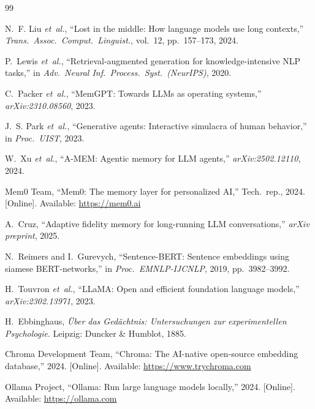 \documentclass[conference]{IEEEtran}
\begin{document}
\begin{thebibliography}{99}

N.~F. Liu \emph{et~al.}, ``Lost in the middle: How language models use long contexts,'' \emph{Trans.\ Assoc.\ Comput.\ Linguist.}, vol.~12, pp.~157--173, 2024.

P.~Lewis \emph{et~al.}, ``Retrieval-augmented generation for knowledge-intensive NLP tasks,'' in \emph{Adv.\ Neural Inf.\ Process.\ Syst.\ (NeurIPS)}, 2020.

C.~Packer \emph{et~al.}, ``MemGPT: Towards LLMs as operating systems,'' \emph{arXiv:2310.08560}, 2023.

J.~S. Park \emph{et~al.}, ``Generative agents: Interactive simulacra of human behavior,'' in \emph{Proc.\ UIST}, 2023.

W.~Xu \emph{et~al.}, ``A-MEM: Agentic memory for LLM agents,'' \emph{arXiv:2502.12110}, 2024.

Mem0 Team, ``Mem0: The memory layer for personalized AI,'' Tech.\ rep., 2024. [Online]. Available: \url{https://mem0.ai}

A.~Cruz, ``Adaptive fidelity memory for long-running LLM conversations,'' \emph{arXiv preprint}, 2025.

N.~Reimers and I.~Gurevych, ``Sentence-BERT: Sentence embeddings using siamese BERT-networks,'' in \emph{Proc.\ EMNLP-IJCNLP}, 2019, pp.~3982--3992.

H.~Touvron \emph{et~al.}, ``LLaMA: Open and efficient foundation language models,'' \emph{arXiv:2302.13971}, 2023.

H.~Ebbinghaus, \emph{\"Uber das Ged\"achtnis: Untersuchungen zur experimentellen Psychologie}. Leipzig: Duncker \& Humblot, 1885.

Chroma Development Team, ``Chroma: The AI-native open-source embedding database,'' 2024. [Online]. Available: \url{https://www.trychroma.com}

Ollama Project, ``Ollama: Run large language models locally,'' 2024. [Online]. Available: \url{https://ollama.com}

\end{thebibliography}
\end{document}
